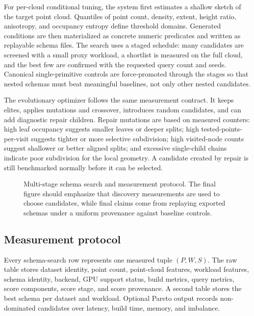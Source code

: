 For per-cloud conditional tuning, the system first estimates a shallow sketch of the target point cloud. Quantiles of point count, density, extent, height ratio, anisotropy, and occupancy entropy define threshold domains. Generated conditions are then materialized as concrete numeric predicates and written as replayable schema files. The search uses a staged schedule: many candidates are screened with a small proxy workload, a shortlist is measured on the full cloud, and the best few are confirmed with the requested query count and seeds. Canonical single-primitive controls are force-promoted through the stages so that nested schemas must beat meaningful baselines, not only other nested candidates.

The evolutionary optimizer follows the same measurement contract. It keeps elites, applies mutations and crossover, introduces random candidates, and can add diagnostic repair children. Repair mutations are based on measured counters: high leaf occupancy suggests smaller leaves or deeper splits; high tested-points-per-visit suggests tighter or more selective subdivision; high visited-node counts suggest shallower or better aligned splits; and excessive single-child chains indicate poor subdivision for the local geometry. A candidate created by repair is still benchmarked normally before it can be selected.

\begin{figure}[t]
  \centering
  \caption{Multi-stage schema search and measurement protocol. The final figure should emphasize that discovery measurements are used to choose candidates, while final claims come from replaying exported schemas under a uniform provenance against baseline controls.}
  \label{fig:staged-search}
\end{figure}

\subsection{Measurement protocol}

Every schema-search row represents one measured tuple $(P,W,S)$. The raw table stores dataset identity, point count, point-cloud features, workload features, schema identity, backend, GPU support status, build metrics, query metrics, score components, score stage, and score provenance. A second table stores the best schema per dataset and workload. Optional Pareto output records non-dominated candidates over latency, build time, memory, and imbalance.

